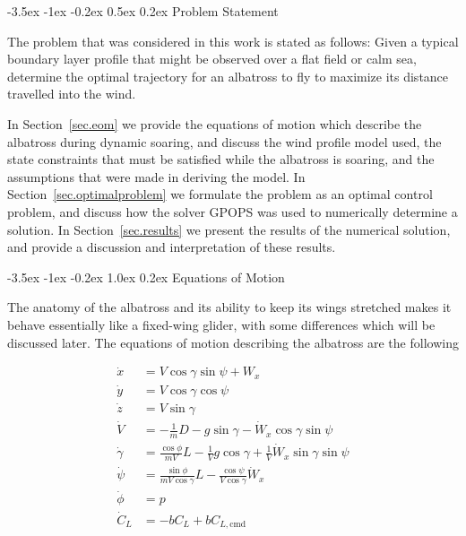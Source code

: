 \documentclass[11pt,letterpaper,onecolumn]{article}
\makeatletter
\renewcommand\section{\@startsection{section}{1}{\z@}%
{-3.5ex \@plus-1ex \@minus-0.2ex}%
{1.0ex \@plus0.2ex}%
{\fontsize{12pt}{12pt}\selectfont\bfseries\sffamily}}
\renewcommand\subsection{\@startsection{subsection}{1}{\z@}%
{-3.5ex \@plus-1ex \@minus-0.2ex}%
{0.5ex \@plus0.2ex}%
{\fontsize{10pt}{10pt}\selectfont\bfseries\sffamily}}
\makeatother
\begin{document}
  \subsection{Problem Statement}\label{sec.problemstatement}

  The problem that was considered in this work is stated as follows: Given a typical boundary layer profile that might be observed over a flat field or calm sea, determine the optimal trajectory for an albatross to fly to maximize its distance travelled into the wind.

  In Section~\ref{sec.eom} we provide the equations of motion which describe the albatross during dynamic soaring, and discuss the wind profile model used, the state constraints that must be satisfied while the albatross is soaring, and the assumptions that were made in deriving the model.
  In Section~\ref{sec.optimalproblem} we formulate the problem as an optimal control problem, and discuss how the solver GPOPS was used to numerically determine a solution.
  In Section~\ref{sec.results} we present the results of the numerical solution, and provide a discussion and interpretation of these results.

  \section{Equations of Motion}\label{sec.eom}

  The anatomy of the albatross and its ability to keep its wings stretched makes it behave essentially like a fixed-wing glider, with some differences which will be discussed later.
  The equations of motion describing the albatross are the following\cite{zhao.optimalpatterns.2004}

  \begin{equation}
    \begin{split}\label{eqn.eom}
      \dot{x}       &= V\cos\gamma\sin\psi+W_{x} \\
      \dot{y}       &= V\cos\gamma\cos\psi \\
      \dot{z}       &= V\sin\gamma \\
      \dot{V}       &= -\frac{1}{m}D-g\sin\gamma-\dot{W}_{x}\cos\gamma\sin\psi \\
      \dot{\gamma}  &= \frac{\cos\phi}{mV}L-\frac{1}{V}g\cos\gamma+\frac{1}{V}\dot{W}_{x}\sin\gamma\sin\psi \\
      \dot{\psi}    &= \frac{\sin\phi}{mV\cos\gamma}L-\frac{\cos\psi}{V\cos\gamma}\dot{W}_{x} \\
      \dot{\phi}    &= p \\
      \dot{C}_{L}   &= -bC_{L}+bC_{L,\text{cmd}}
    \end{split}
  \end{equation}
\end{document}
